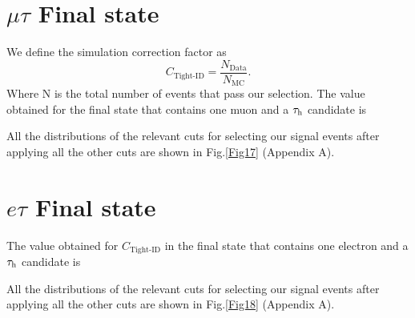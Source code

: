 \section{$\mu\tau$ Final state}
We define the simulation correction factor as
\begin{equation}
	C_{\text{Tight-ID}}=\frac{N_{\text{Data}}}{N_{\text{MC}}}.
\end{equation}
Where N is the total number of events that pass our selection. The value obtained for the final state that contains one muon and a $\tau_\text{h}$ candidate is

All the distributions of the relevant cuts for selecting our signal events after applying all the other cuts are shown in Fig.\ref{Fig17} (Appendix A).
\section{$e\tau$ Final state}
The value obtained for $C_{\text{Tight-ID}}$ in the final state that contains one electron and a $\tau_\text{h}$ candidate is

All the distributions of the relevant cuts for selecting our signal events after applying all the other cuts are shown in Fig.\ref{Fig18} (Appendix A).
